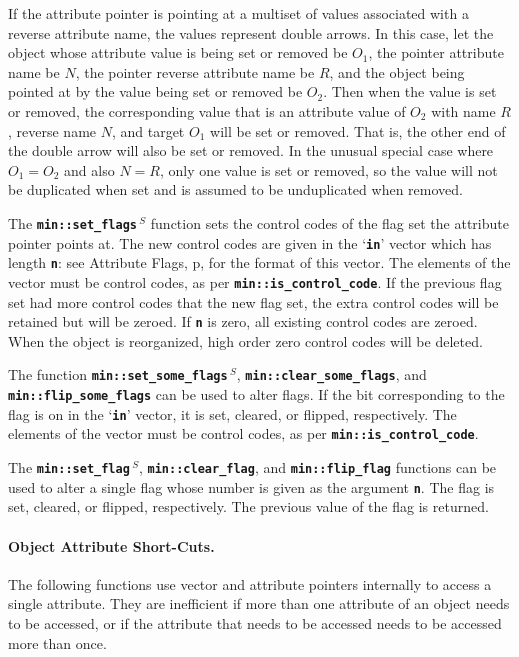 \documentclass[12pt]{article}
\newcommand{\subsubsubsection}[1]{\paragraph[#1]{#1.}}
\newcommand{\TT}[1]{{\tt \bfseries #1}}
\newcommand{\pagref}[1]{p\pageref{#1}}
\newcommand{\EOL}{\penalty \exhyphenpenalty}
\newcommand{\RESIZE}{$\,^S$}
\begin{document}
If the attribute pointer is pointing at a multiset of values
associated with a reverse attribute name,
the values represent double arrows.
In this case, let the object whose attribute value is being set or removed
be $O_1$, the pointer attribute name be $N$, the pointer reverse
attribute name be $R$, and the object being pointed at by the value
being set or removed be $O_2$.
Then when the value is set or removed, the corresponding value that is
an attribute value of $O_2$ with name $R$, reverse name $N$, and target $O_1$
will be set or removed.
That is, the other end of the double arrow will also be set or removed.
In the unusual special case where $O_1=O_2$ and also $N=R$, only one value
is set or removed, so the value will not be duplicated when set and is
assumed to be unduplicated when removed.

The \TT{min::\EOL set\_\EOL flags\RESIZE} function sets the control codes
of the flag set the attribute pointer points at.
The new control codes are given in the `\TT{in}' vector which
has length \TT{n}: see 
Attribute Flags, \pagref{ATTRIBUTE-FLAGS},
for the format of this vector.  The elements of the vector must
be control codes, as per \TT{min::\EOL is\_\EOL control\_\EOL code}.
If the previous flag set had more control codes that the new flag
set, the extra control codes will be retained but will be zeroed.
If \TT{n} is zero, all existing control codes are zeroed.
When the object is reorganized, high order zero control codes will
be deleted.

The function \TT{min::\EOL set\_\EOL some\_\EOL flags\RESIZE},
\TT{min::\EOL clear\_\EOL some\_\EOL flags},
and \TT{min::\EOL flip\_\EOL some\_\EOL flags}
can be used to alter flags.  If the bit corresponding
to the flag is on in the `\TT{in}' vector, it is set, cleared,
or flipped, respectively.
The elements of the vector must
be control codes, as per \TT{min::\EOL is\_\EOL control\_\EOL code}.

The \TT{min::\EOL set\_\EOL flag\RESIZE},
\TT{min::\EOL clear\_\EOL flag},
and \TT{min::\EOL flip\_\EOL flag}
functions can be used to alter a single flag whose number is
given as the argument \TT{n}.  The flag is set, cleared,
or flipped, respectively.  The previous value of the flag is
returned.

\subsubsubsection{Object Attribute Short-Cuts}
\label{OBJECT ATTRIBUTE SHORT-CUTS}

The following functions use vector and attribute pointers
internally to access a single attribute.  They are inefficient
if more than one attribute of an object needs to be accessed,
or if the attribute that needs to be accessed needs to be
accessed more than once.
\end{document}
